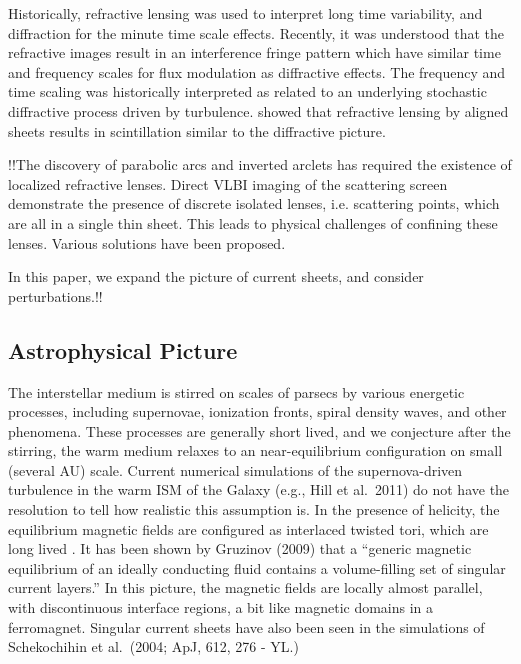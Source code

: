 \documentclass[useAMS,usenatbib]{mn2e}
\begin{document}
Historically, refractive lensing was used to interpret long time
variability, and diffraction for the minute time scale
effects. Recently, it was understood that the refractive images result
in an interference fringe pattern\cite{2004MNRAS.354...43W} which have
similar time and frequency scales for flux modulation as diffractive
effects.  The frequency and time scaling was historically interpreted
as related to an underlying stochastic diffractive process driven by
turbulence.
\cite{2006ApJ...640L.159G} showed that refractive lensing by aligned
sheets  results in
scintillation similar to the diffractive picture.




!!The discovery of parabolic arcs\citep{2001ApJ...549L..97S} and
inverted arclets has required the existence of localized refractive
lenses.  Direct VLBI imaging of the scattering
screen\citep{2010ApJ...708..232B} demonstrate the presence of
discrete isolated lenses, i.e. scattering points, which are all in a
single thin sheet. This leads to physical challenges of confining
these lenses. Various solutions have been
proposed\citep{2007ASPC..365..299W,2012MNRAS.421L.132P,2006ApJ...640L.159G}.

In this paper, we expand the picture of current sheets, and consider
perturbations.!!


\subsection{Astrophysical Picture}

The interstellar medium is stirred on scales of parsecs by various
energetic processes, including supernovae, ionization fronts, spiral
density waves, and other phenomena.  These processes are generally
short lived, and we conjecture after the stirring, the warm medium
relaxes to an near-equilibrium configuration on small (several AU)
scale. Current numerical simulations of the supernova-driven
turbulence in the warm ISM of the Galaxy (e.g., Hill et al.~2011) do
not have the resolution to tell how realistic this assumption is.  In
the presence of helicity, the equilibrium magnetic fields are
configured as interlaced twisted tori, which are long lived
\citep{2004Natur.431..819B}.  It has been shown by Gruzinov (2009)
that a ``generic magnetic equilibrium of an ideally conducting fluid
contains a volume-filling set of singular current layers.'' In this
picture, the magnetic fields are locally almost parallel, with
discontinuous interface regions, a bit like magnetic domains in a
ferromagnet. Singular current sheets have also been seen in the
simulations of Schekochihin et al.~(2004; ApJ, 612, 276 - YL.)
\end{document}
